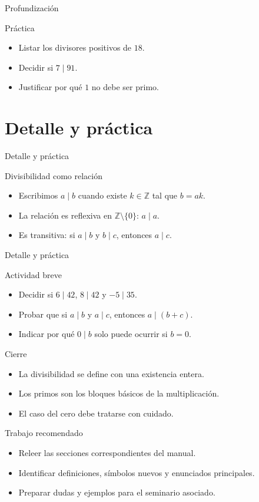 \documentclass[aspectratio=169,11pt]{beamer}
\begin{document}
\begin{frame}{Profundización}
\begin{block}{Práctica}
\begin{itemize}
  \item Listar los divisores positivos de \(18\).
  \item Decidir si \(7\mid 91\).
  \item Justificar por qué \(1\) no debe ser primo.
\end{itemize}
\end{block}
\end{frame}


\section{Detalle y práctica}

\begin{frame}{Detalle y práctica}
\begin{block}{Divisibilidad como relación}
\begin{itemize}
  \item Escribimos \(a\mid b\) cuando existe \(k\in\mathbb{Z}\) tal que \(b=ak\).
  \item La relación es reflexiva en \(\mathbb{Z}\setminus\{0\}\): \(a\mid a\).
  \item Es transitiva: si \(a\mid b\) y \(b\mid c\), entonces \(a\mid c\).
\end{itemize}
\end{block}
\end{frame}

\begin{frame}{Detalle y práctica}
\begin{block}{Actividad breve}
\begin{itemize}
  \item Decidir si \(6\mid 42\), \(8\mid 42\) y \(-5\mid 35\).
  \item Probar que si \(a\mid b\) y \(a\mid c\), entonces \(a\mid (b+c)\).
  \item Indicar por qué \(0\mid b\) solo puede ocurrir si \(b=0\).
\end{itemize}
\end{block}
\end{frame}

\begin{frame}{Cierre}
\begin{itemize}
  \item La divisibilidad se define con una existencia entera.
  \item Los primos son los bloques básicos de la multiplicación.
  \item El caso del cero debe tratarse con cuidado.
\end{itemize}
\end{frame}

\begin{frame}{Trabajo recomendado}
\begin{itemize}
  \item Releer las secciones correspondientes del manual.
  \item Identificar definiciones, símbolos nuevos y enunciados principales.
  \item Preparar dudas y ejemplos para el seminario asociado.
\end{itemize}
\end{frame}
\end{document}

